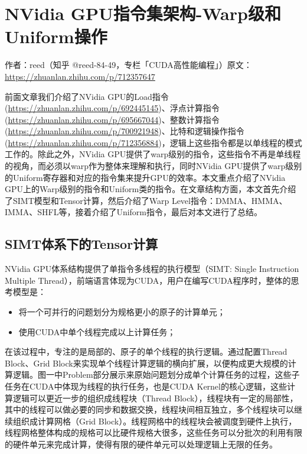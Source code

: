\chapter{NVidia GPU指令集架构-Warp级和Uniform操作}

\begin{center}\small 作者：reed（知乎 @reed-84-49，专栏「CUDA高性能编程」）\quad 原文：\url{https://zhuanlan.zhihu.com/p/712357647}\end{center}

前面文章我们介绍了NVidia GPU的Load指令(\url{https://zhuanlan.zhihu.com/p/692445145})、浮点计算指令(\url{https://zhuanlan.zhihu.com/p/695667044})、整数计算指令(\url{https://zhuanlan.zhihu.com/p/700921948})、比特和逻辑操作指令(\url{https://zhuanlan.zhihu.com/p/712356884})，逻辑上这些指令都是以单线程的模式工作的。除此之外，NVidia GPU提供了warp级别的指令，这些指令不再是单线程的视角，而必须以warp作为整体来理解和执行，同时NVidia GPU提供了warp级别的Uniform寄存器和对应的指令集来提升GPU的效率。本文重点介绍了NVidia GPU上的Warp级别的指令和Uniform类的指令。在文章结构方面，本文首先介绍了SIMT模型和Tensor计算，然后介绍了Warp Level指令：DMMA、HMMA、IMMA、SHFL等，接着介绍了Uniform指令，最后对本文进行了总结。

\section{SIMT体系下的Tensor计算}

NVidia GPU体系结构提供了单指令多线程的执行模型（SIMT: Single Instruction Multiple Thread），前端语言体现为CUDA，用户在编写CUDA程序时，整体的思考模型是：

\begin{itemize}
\item 将一个可并行的问题划分为规格更小的原子的计算单元；
\item 使用CUDA中单个线程完成以上计算任务；
\end{itemize}

在该过程中，专注的是局部的、原子的单个线程的执行逻辑。通过配置Thread Block、Grid Block来实现单个线程计算逻辑的横向扩展，以便构成更大规模的计算逻辑。图一中Problem部分展示来原始问题划分成单个计算任务的过程，这些子任务在CUDA中体现为线程的执行任务，也是CUDA Kernel的核心逻辑，这些计算逻辑可以更近一步的组织成线程块（Thread Block），线程块有一定的局部性，其中的线程可以做必要的同步和数据交换，线程块间相互独立，多个线程块可以继续组织成计算网格（Grid Block）。线程网格中的线程块会被调度到硬件上执行，线程网格整体构成的规格可以比硬件规格大很多，这些任务可以分批次的利用有限的硬件单元来完成计算，使得有限的硬件单元可以处理逻辑上无限的任务。

